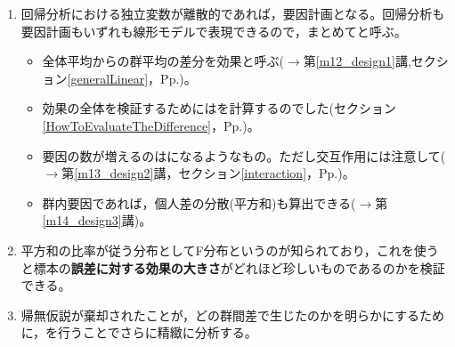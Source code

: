 \begin{enumerate}
	\item 回帰分析における独立変数が離散的であれば，要因計画となる。回帰分析も要因計画もいずれも線形モデルで表現できるので，まとめてと呼ぶ。
	      \begin{itemize}
		      \item 全体平均からの群平均の差分を効果と呼ぶ($\to$第\ref{m12_design1}講,セクション\ref{generalLinear}，Pp.\pageref{generalLinear})。
		      \item 効果の全体を検証するためにはを計算するのでした(セクション\ref{HowToEvaluateTheDifference}，Pp.\pageref{HowToEvaluateTheDifference})。
		      \item 要因の数が増えるのはになるようなもの。ただし交互作用には注意して($\to$第\ref{m13_design2}講，セクション\ref{interaction}，Pp.\pageref{interaction})。
		      \item 群内要因であれば，個人差の分散(平方和)も算出できる($\to$第\ref{m14_design3}講)。
	      \end{itemize}
	\item 平方和の比率が従う分布としてF分布というのが知られており，これを使うと標本の\textbf{誤差に対する効果の大きさ}がどれほど珍しいものであるのかを検証できる。
	\item 帰無仮説が棄却されたことが，どの群間差で生じたのかを明らかにするために，を行うことでさらに精緻に分析する。
\end{enumerate}
